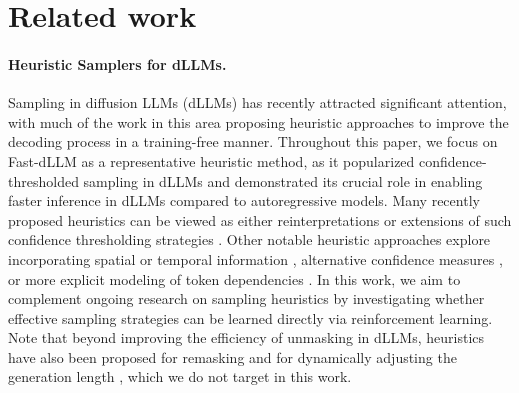 
\section{Related work}
\label{sec:related}


\paragraph{Heuristic Samplers for dLLMs.} Sampling in diffusion LLMs (dLLMs) \citep{llada2025, ye2025dream} has recently attracted significant attention, with much of the work in this area proposing heuristic approaches to improve the decoding process in a training-free manner. Throughout this paper, we focus on Fast-dLLM \citep{fastdllm2025} as a representative heuristic method, as it popularized confidence-thresholded sampling in dLLMs and demonstrated its crucial role in enabling faster inference in dLLMs compared to autoregressive models. Many recently proposed heuristics can be viewed as either reinterpretations or extensions of such confidence thresholding strategies \citep{ben2025accelerated, wei2025accelerating, hong2025wide, li2025diffusion, yu2025dimple}. Other notable heuristic approaches explore incorporating spatial \citep{huang2025pc} or temporal information \citep{wang2025time}, alternative confidence measures \citep{kim2025train}, or more explicit modeling of token dependencies \citep{azangulov2025parallel}. In this work, we aim to complement ongoing research on sampling heuristics by investigating whether effective sampling strategies can be learned directly via reinforcement learning.
Note that beyond improving the efficiency of unmasking in dLLMs, heuristics have also been proposed for remasking \citep{hong2025wide, dong2025saber} and for dynamically adjusting the generation length \citep{li2025beyond}, which we do not target in this work.

